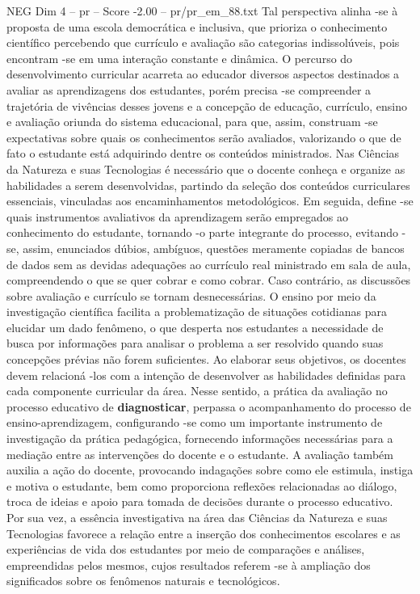 \begin{textsample}{NEG Dim 4 – pr – Score -2.00 – pr/pr\_em\_88.txt}
Tal perspectiva alinha -se à proposta de uma escola democrática e inclusiva, que prioriza o conhecimento científico percebendo que currículo e avaliação são categorias indissolúveis, pois encontram -se em uma interação constante e dinâmica.
O percurso do desenvolvimento curricular acarreta ao educador diversos aspectos destinados a avaliar as aprendizagens dos estudantes, porém precisa -se compreender a trajetória de vivências desses jovens e a concepção de educação, currículo, ensino e avaliação oriunda do sistema educacional, para que, assim, construam -se expectativas sobre quais os conhecimentos serão avaliados, valorizando o que de fato o estudante está adquirindo dentre os conteúdos ministrados.
Nas Ciências da Natureza e suas Tecnologias é necessário que o docente conheça e organize as habilidades a serem desenvolvidas, partindo da seleção dos conteúdos curriculares essenciais, vinculadas aos encaminhamentos metodológicos.
Em seguida, define -se quais instrumentos avaliativos da aprendizagem serão empregados ao conhecimento do estudante, tornando -o parte integrante do processo, evitando -se, assim, enunciados dúbios, ambíguos, questões meramente copiadas de bancos de dados sem as devidas adequações ao currículo real ministrado em sala de aula, compreendendo o que se quer cobrar e como cobrar.
Caso contrário, as discussões sobre avaliação e currículo se tornam desnecessárias.
O ensino por meio da investigação científica facilita a problematização de situações cotidianas para elucidar um dado fenômeno, o que desperta nos estudantes a necessidade de busca por informações para analisar o problema a ser resolvido quando suas concepções prévias não forem suficientes.
Ao elaborar seus objetivos, os docentes devem relacioná -los com a intenção de desenvolver as habilidades definidas para cada componente curricular da área.
Nesse sentido, a prática da avaliação no processo educativo de \textbf{diagnosticar}, perpassa o acompanhamento do processo de ensino-aprendizagem, configurando -se como um importante instrumento de investigação da prática pedagógica, fornecendo informações necessárias para a mediação entre as intervenções do docente e o estudante.
A avaliação também auxilia a ação do docente, provocando indagações sobre como ele estimula, instiga e motiva o estudante, bem como proporciona reflexões relacionadas ao diálogo, troca de ideias e apoio para tomada de decisões durante o processo educativo.
Por sua vez, a essência investigativa na área das Ciências da Natureza e suas Tecnologias favorece a relação entre a inserção dos conhecimentos escolares e as experiências de vida dos estudantes por meio de comparações e análises, empreendidas pelos mesmos, cujos resultados referem -se à ampliação dos significados sobre os fenômenos naturais e tecnológicos.

\end{textsample}

